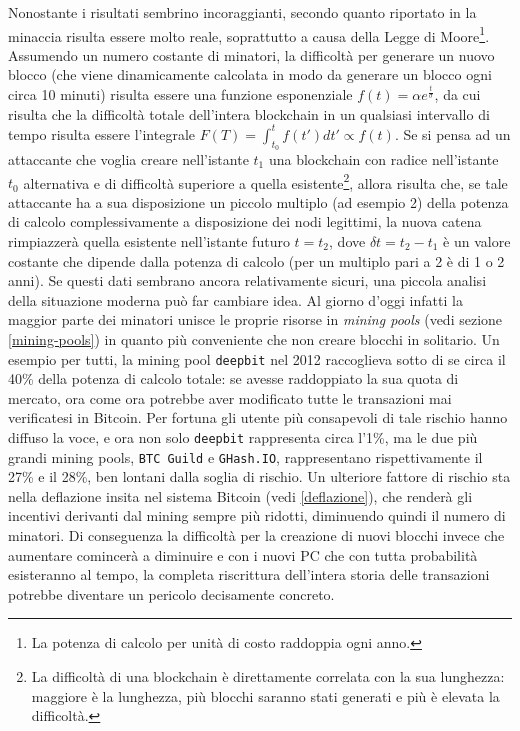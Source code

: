 Nonostante i risultati sembrino incoraggianti, secondo quanto riportato in \cite{bitter-better} la minaccia risulta essere molto reale, soprattutto a causa della Legge di Moore\footnote{La potenza di calcolo per unità di costo raddoppia ogni anno.}.
Assumendo un numero costante di minatori, la difficoltà per generare un nuovo blocco (che viene dinamicamente calcolata in modo da generare un blocco ogni circa 10 minuti) risulta essere una funzione esponenziale $f(t) = \alpha e^\frac{t}{\sigma}$, da cui risulta che la difficoltà totale dell'intera blockchain in un qualsiasi intervallo di tempo risulta essere l'integrale $F(T) = \int^t_{t_0} f(t')dt' \propto f(t)$.
Se si pensa ad un attaccante che voglia creare nell'istante $t_1$ una blockchain con radice nell'istante $t_0$ alternativa e di difficoltà superiore a quella esistente\footnote{La difficoltà di una blockchain è direttamente correlata con la sua lunghezza: maggiore è la lunghezza, più blocchi saranno stati generati e più è elevata la difficoltà.}, allora risulta che, se tale attaccante ha a sua disposizione un piccolo multiplo (ad esempio 2) della potenza di calcolo complessivamente a disposizione dei nodi legittimi, la nuova catena rimpiazzerà quella esistente nell'istante futuro $t=t_2$, dove $\delta t = t_2 - t_1$ è un valore costante che dipende dalla potenza di calcolo (per un multiplo pari a 2 è di 1 o 2 anni).
Se questi dati sembrano ancora relativamente sicuri, una piccola analisi della situazione moderna può far cambiare idea. Al giorno d'oggi infatti la maggior parte dei minatori unisce le proprie risorse in \emph{mining pools} (vedi sezione \ref{mining-pools}) in quanto più conveniente che non creare blocchi in solitario. Un esempio per tutti, la mining pool \verb|deepbit| nel 2012 raccoglieva sotto di se circa il 40\% della potenza di calcolo totale: se avesse raddoppiato la sua quota di mercato, ora come ora potrebbe aver modificato tutte le transazioni mai verificatesi in Bitcoin. Per fortuna gli utente più consapevoli di tale rischio hanno diffuso la voce, e ora non solo \verb|deepbit| rappresenta circa l'1\%, ma le due più grandi mining pools, \verb|BTC Guild| e \verb|GHash.IO|, rappresentano rispettivamente il 27\% e il 28\%, ben lontani dalla soglia di rischio.
Un ulteriore fattore di rischio sta nella deflazione insita nel sistema Bitcoin (vedi \ref{deflazione}), che renderà gli incentivi derivanti dal mining sempre più ridotti, diminuendo quindi il numero di minatori. Di conseguenza la difficoltà per la creazione di nuovi blocchi invece che aumentare comincerà a diminuire e con i nuovi PC che con tutta probabilità esisteranno al tempo, la completa riscrittura dell'intera storia delle transazioni potrebbe diventare un pericolo decisamente concreto.

